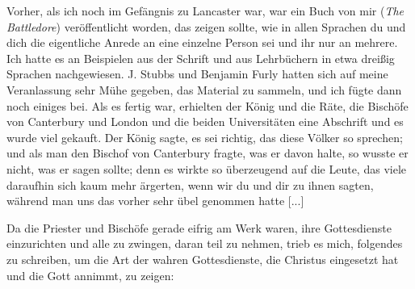 Vorher, als ich noch im Gefängnis zu Lancaster war, war
ein Buch von mir (\textit{The Battledore}) veröffentlicht 
worden, das zeigen sollte, wie in allen Sprachen \glqq du\grqq{} 
und \glqq dich\grqq{} die eigentliche Anrede an eine einzelne 
Person sei und \glqq ihr\grqq{} nur an mehrere.
Ich hatte es an Beispielen aus der Schrift und aus Lehrbüchern
in etwa dreißig Sprachen nachgewiesen. J. Stubbs und Benjamin
Furly hatten sich auf meine Veranlassung sehr Mühe gegeben,
das Material zu sammeln, und ich fügte dann noch einiges bei.
Als es fertig war, erhielten der König und die Räte, die Bischöfe
von Canterbury und London und die beiden Universitäten eine
Abschrift und es wurde viel gekauft. Der König sagte, es sei
richtig, das diese Völker so sprechen; und als man den Bischof
von Canterbury fragte, was er davon halte, so wusste er nicht,
was er sagen sollte; denn es wirkte so überzeugend auf die Leute,
das viele daraufhin sich kaum mehr ärgerten, wenn wir \glqq du\grqq{}
und \glqq dir\grqq{} zu ihnen sagten, während man uns das vorher sehr
übel genommen hatte [...]

Da die Priester und Bischöfe gerade eifrig am Werk waren,
ihre Gottesdienste einzurichten und alle zu zwingen, daran teil
zu nehmen, trieb es mich, folgendes zu schreiben, um die Art der
wahren Gottesdienste, die Christus eingesetzt hat und die Gott
annimmt, zu zeigen:


